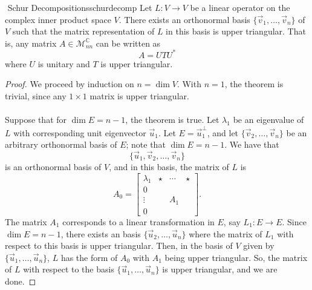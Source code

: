         \begin{theorem}{\Stop\,\,Schur Decompositions}{schurdecomp}
            Let \(L:V\to V\) be a linear operator on the complex inner product space \(V\). There exists an orthonormal basis \(\{\vec{v}_1,\ldots,\vec{v}_n\}\) of \(V\) such that the matrix representation of \(L\) in this basis is upper triangular. That is, any matrix \(A\in\mathcal{M}_{nn}^{\mathbb{C}}\) can be written as
            \begin{equation*}
                A=UTU^*
            \end{equation*}
            where \(U\) is unitary and \(T\) is upper triangular.
            \begin{proof}
                We proceed by induction on \(n=\dim V\). With \(n=1\), the theorem is trivial, since any \(1\times 1\) matrix is upper triangular.
                \\
                \\
                Suppose that for \(\dim E=n-1\), the theorem is true. Let \(\lambda_1\) be an eigenvalue of \(L\) with corresponding unit eigenvector \(\vec{u}_1\). Let \(E=\vec{u}_1^\perp\), and let \(\{\vec{v}_2,\ldots,\vec{v}_n\}\) be an arbitrary orthonormal basis of \(E\); note that \(\dim E=n-1\). We have that
                \begin{equation*}
                    \{\vec{u}_1,\vec{v}_2,\ldots,\vec{v}_n\}
                \end{equation*}
                is an orthonormal basis of \(V\), and in this basis, the matrix of \(L\) is
                \begin{equation*}
                    A_0=\begin{bmatrix}
                            \lambda_1 & \star & \cdots & \star \\
                                0 &       &        &       \\
                            \vdots &       &     A_1 &       \\
                                0 &       &        &
                        \end{bmatrix}.
                \end{equation*}
                The matrix \(A_1\) corresponds to a linear transformation in \(E\), say \(L_1:E\to E\). Since \(\dim E=n-1\), there exists an basis \(\{\vec{u}_2,\ldots,\vec{u}_n\}\) where the matrix of \(L_1\) with respect to this basis is upper triangular. Then, in the basis of \(V\) given by \(\{\vec{u}_1,\ldots,\vec{u}_n\}\), \(L\) has the form of \(A_0\) with \(A_1\) being upper triangular. So, the matrix of \(L\) with respect to the basis \(\{\vec{u}_1,\ldots,\vec{u}_n\}\) is upper triangular, and we are done.
            \end{proof}
        \end{theorem}

